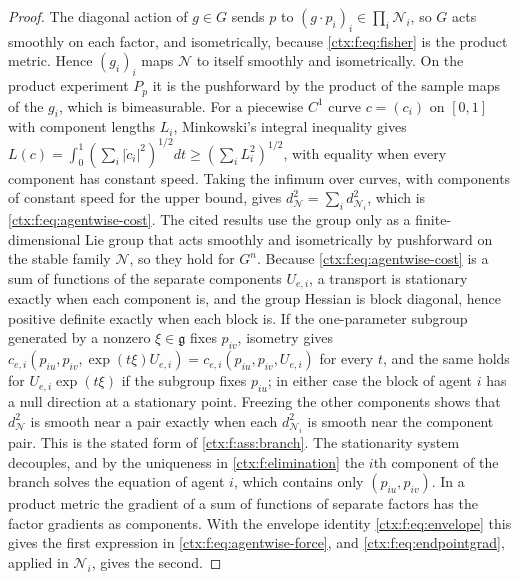 \begin{proof}
The diagonal action of $g\in G$ sends $p$ to $(g\cdot p_i)_i\in\prod_i\mathcal N_i$, so $G$ acts smoothly on each factor, and isometrically, because \cref{ctx:f:eq:fisher} is the product metric. Hence $(g_i)_i$ maps $\mathcal N$ to itself smoothly and isometrically. On the product experiment $P_p$ it is the pushforward by the product of the sample maps of the $g_i$, which is bimeasurable. For a piecewise $C^1$ curve $c=(c_i)$ on $[0,1]$ with component lengths $L_i$, Minkowski's integral inequality gives $L(c)=\int_0^1(\sum_i|\dot c_i|^2)^{1/2}dt\geq(\sum_iL_i^2)^{1/2}$, with equality when every component has constant speed. Taking the infimum over curves, with components of constant speed for the upper bound, gives $d_{\mathcal N}^2=\sum_id_{\mathcal N_i}^2$, which is \cref{ctx:f:eq:agentwise-cost}. The cited results use the group only as a finite-dimensional Lie group that acts smoothly and isometrically by pushforward on the stable family $\mathcal N$, so they hold for $G^n$. Because \cref{ctx:f:eq:agentwise-cost} is a sum of functions of the separate components $U_{e,i}$, a transport is stationary exactly when each component is, and the group Hessian is block diagonal, hence positive definite exactly when each block is. If the one-parameter subgroup generated by a nonzero $\xi\in\mathfrak g$ fixes $p_{iv}$, isometry gives $c_{e,i}(p_{iu},p_{iv},\exp(t\xi)U_{e,i})=c_{e,i}(p_{iu},p_{iv},U_{e,i})$ for every $t$, and the same holds for $U_{e,i}\exp(t\xi)$ if the subgroup fixes $p_{iu}$; in either case the block of agent $i$ has a null direction at a stationary point. Freezing the other components shows that $d_{\mathcal N}^2$ is smooth near a pair exactly when each $d_{\mathcal N_i}^2$ is smooth near the component pair. This is the stated form of \cref{ctx:f:ass:branch}. The stationarity system decouples, and by the uniqueness in \cref{ctx:f:elimination} the $i$th component of the branch solves the equation of agent $i$, which contains only $(p_{iu},p_{iv})$. In a product metric the gradient of a sum of functions of separate factors has the factor gradients as components. With the envelope identity \cref{ctx:f:eq:envelope} this gives the first expression in \cref{ctx:f:eq:agentwise-force}, and \cref{ctx:f:eq:endpointgrad}, applied in $\mathcal N_i$, gives the second.
\end{proof}


